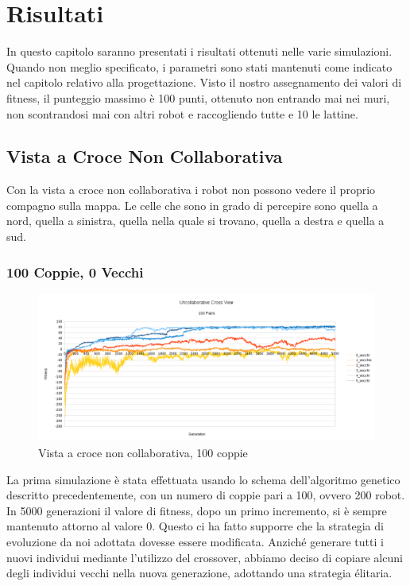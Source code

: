 \chapter{Risultati}
In questo capitolo saranno presentati i risultati ottenuti nelle varie
simulazioni. Quando non meglio specificato, i parametri sono stati mantenuti
come indicato nel capitolo relativo alla progettazione.\newline
Visto il nostro assegnamento dei valori di fitness, il punteggio massimo è 100
punti, ottenuto non entrando mai nei muri, non scontrandosi mai con altri robot
e raccogliendo tutte e 10 le lattine.



\section{Vista a Croce Non Collaborativa}
Con la vista a croce non collaborativa i robot non possono vedere il proprio
compagno sulla mappa. Le celle che sono in grado di percepire sono quella a
nord, quella a sinistra, quella nella quale si trovano, quella a destra e quella
a sud.

\subsection{100 Coppie, 0 Vecchi}
\begin{figure}[ht]
	\centering
	\includegraphics[scale=0.7,angle=90]{imgs/uncollaborative_cross_100_pairs_0_5_vecchi.png}
	\caption{Vista a croce non collaborativa, 100 coppie}
	\label{figure:uncoll_cross_100_0_5}
\end{figure}
La prima simulazione è stata effettuata usando lo schema dell'algoritmo genetico
descritto precedentemente, con un numero di coppie pari a 100, ovvero 200 robot.
In 5000 generazioni il valore di fitness, dopo un primo incremento, si è sempre
mantenuto attorno al valore 0. Questo ci ha fatto supporre che la strategia di
evoluzione da noi adottata dovesse essere modificata. Anziché generare tutti i
nuovi individui mediante l'utilizzo del crossover, abbiamo deciso di copiare
alcuni degli individui vecchi nella nuova generazione, adottando una strategia
élitaria.

